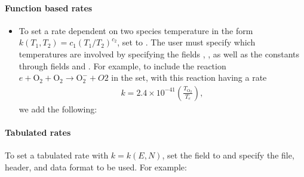 \documentclass[letterpaper,10pt,english]{sphinxmanual}
\begin{document}
\paragraph{Function based rates}
\label{\detokenize{Applications/CdrPlasmaModel:function-based-rates}}\begin{itemize}
\item {} 
To set a rate dependent on two species temperature in the form \(k(T_1, T_2) = c_1\left(T_1/T_2\right)^{c_2}\), set  to .
The user must specify which temperatures are involved by specifying the fields , , as well as the constants through fields  and .
For example, to include the reaction \(e + \textrm{O}_2 + \textrm{O}_2 \rightarrow \textrm{O}_2^- + O2\) in the set, with this reaction having a rate
\begin{equation*}
\begin{split}k = 2.4\times 10^{-41}\left(\frac{T_{\textrm{O}_2}}{T_e}\right),\end{split}
\end{equation*}
we add the following:

\begin{sphinxVerbatim}[commandchars=\\\{\},formatcom=\scriptsize]
  \PYG{p}{[}
       
       
       
       
       
       
  \PYG{p}{]}
\end{sphinxVerbatim}

\end{itemize}


\paragraph{Tabulated rates}
\label{\detokenize{Applications/CdrPlasmaModel:tabulated-rates}}
To set a tabulated rate with \(k = k(E,N)\), set the field  to  and specify the file, header, and data format to be used.
For example:
\end{document}
